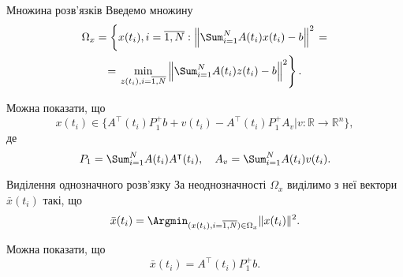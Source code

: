 \begin{mframe}{Множина розв'язків}
    Введемо множину
    \begin{multline}
        \label{eq:1.17}
        \Omega_x = \left\{ x(t_i), i = \overline{1,N}: 
        \left\| \Sum_{i = 1}^N A(t_i) x(t_i) - b \right\|^2 \right. = \\ 
        = \left. \min_{z(t_i), i = \overline{1,N}} 
        \left\| \Sum_{i = 1}^N A(t_i) z(t_i) - b \right\|^2 \right\}.
    \end{multline}
    
    Можна показати, що
    \begin{equation}
        \label{eq:1.19}
        x(t_i) \in \Big\{ A^\intercal(t_i) P_1^+ b + v(t_i) - A^\intercal(t_i) 
        P_1^+ A_v \Big| v: \mathbb{R} \to \mathbb{R}^n \Big\},
    \end{equation}
    де
    \begin{equation*}
        P_1 = \Sum_{i = 1}^N A(t_i) A^\intercal(t_i), \quad
        A_v = \Sum_{i = 1}^N A(t_i) v(t_i).
    \end{equation*}
\end{mframe}

\begin{mframe}{Виділення однозначного розв'язку}
    За неоднозначності $\Omega_x$ виділимо з неї вектори $\bar x(t_i)$ такі, що
    \begin{equation}
        \label{eq:1.18}
        \bar x(t_i) = 
        \Argmin_{(x(t_i), i = \overline{1, N}) \in \Omega_x} \|x(t_i)\|^2.
    \end{equation}
    
    Можна показати, що
    \begin{equation}
        \label{eq:1.20}
        \bar x(t_i) = A^\intercal(t_i) P_1^+ b.
    \end{equation}
\end{mframe}

